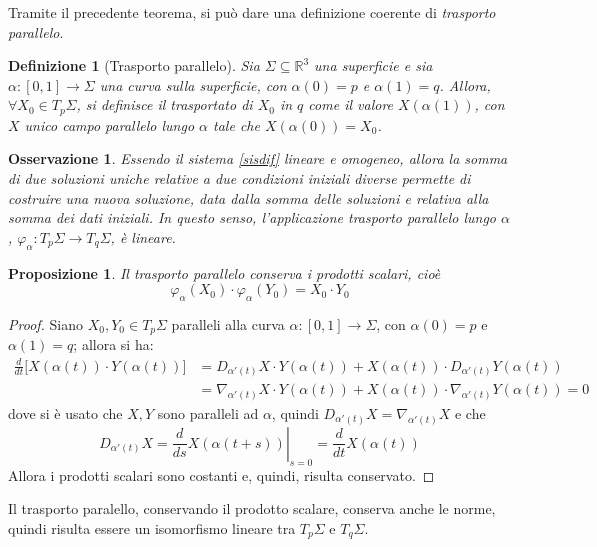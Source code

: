 \documentclass[12pt]{scrartcl}
\theoremstyle{style}
\newtheorem{definizione}{Definizione}[section]
\newtheorem{prop}{Proposizione}[section]
\newtheorem{osservazione}{Osservazione}[section]
\newcommand*\Eval[3]{\left.#1\right\rvert_{#2}^{#3}}
\numberwithin{equation}{subsection}
\begin{document}
\noindent Tramite il precedente teorema, si pu\`o dare una definizione coerente di \textit{trasporto parallelo}.
\begin{definizione}
	[Trasporto parallelo]
	Sia $\Sigma \subseteq \mathbb{R}^{3}$ una superficie e sia $\alpha :[0,1] \to \Sigma$ una curva sulla superficie, con $\alpha (0) = p$ e $\alpha (1) = q$.
	Allora, $\forall X_0\in T_p\Sigma $, si definisce il \textit{trasportato} di $X_0$ in $q$ come il valore $X(\alpha (1))$, con $X$ unico campo parallelo lungo $\alpha $ tale che $X(\alpha (0)) = X_0$.
\end{definizione}
\begin{osservazione}
	Essendo il sistema \ref{sisdif} lineare e omogeneo, allora la somma di due soluzioni uniche relative a due condizioni iniziali diverse permette di costruire una nuova soluzione, data dalla somma delle soluzioni e relativa alla somma dei dati iniziali.
	In questo senso, l'applicazione trasporto parallelo lungo $\alpha $, $\varphi _\alpha :T_p\Sigma \to T_q \Sigma$, \`e lineare.
\end{osservazione}
\begin{prop}
	Il trasporto parallelo conserva i prodotti scalari, cio\`e
	\[
	\varphi _\alpha (X_0) \cdot \varphi _\alpha (Y_0) = X_0\cdot Y_0
	\] 
\end{prop}
\begin{proof}
	Siano $X_0,Y_0\in T_p \Sigma$ paralleli alla curva $\alpha : [0,1] \to \Sigma$, con $\alpha (0) = p$ e $\alpha (1) = q$; allora si ha:
	\[
		\begin{split}
			\frac{d }{d t} \big[X(\alpha (t)) \cdot Y(\alpha (t))\big] &= D_{\alpha '(t)} X \cdot Y(\alpha (t)) + X(\alpha (t)) \cdot D_{\alpha '(t)} Y(\alpha (t))\\
										   &=\nabla _{\alpha '(t)} X \cdot Y(\alpha (t)) + X(\alpha (t)) \cdot \nabla _{\alpha '(t)} Y(\alpha (t)) = 0
		\end{split}
	\] 
	dove si \`e usato che $X,Y$ sono paralleli ad $\alpha $, quindi $D_{\alpha '(t)} X = \nabla _{\alpha '(t)} X$ e che
	\[
		D_{\alpha '(t)} X = \Eval{\frac{d }{d s} X(\alpha (t+s))}{s=0}{} = \frac{d }{d t} X(\alpha (t))
	\] 
	Allora i prodotti scalari sono costanti e, quindi, risulta conservato.
\end{proof}
\noindent Il trasporto paralello, conservando il prodotto scalare, conserva anche le norme, quindi risulta essere un isomorfismo lineare tra $T_p\Sigma$ e $T_q \Sigma$.
\end{document}
